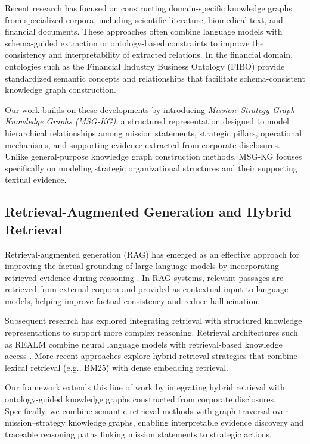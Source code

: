 \documentclass[11pt]{article}
\begin{document}
Recent research has focused on constructing domain-specific knowledge graphs from specialized corpora, including scientific literature, biomedical text, and financial documents. These approaches often combine language models with schema-guided extraction or ontology-based constraints to improve the consistency and interpretability of extracted relations. In the financial domain, ontologies such as the Financial Industry Business Ontology (FIBO) provide standardized semantic concepts and relationships that facilitate schema-consistent knowledge graph construction.

Our work builds on these developments by introducing \textit{Mission--Strategy Graph Knowledge Graphs (MSG-KG)}, a structured representation designed to model hierarchical relationships among mission statements, strategic pillars, operational mechanisms, and supporting evidence extracted from corporate disclosures. Unlike general-purpose knowledge graph construction methods, MSG-KG focuses specifically on modeling strategic organizational structures and their supporting textual evidence.

\subsection{Retrieval-Augmented Generation and Hybrid Retrieval}

Retrieval-augmented generation (RAG) has emerged as an effective approach for improving the factual grounding of large language models by incorporating retrieved evidence during reasoning \cite{lewis2020retrieval}. In RAG systems, relevant passages are retrieved from external corpora and provided as contextual input to language models, helping improve factual consistency and reduce hallucination.

Subsequent research has explored integrating retrieval with structured knowledge representations to support more complex reasoning. Retrieval architectures such as REALM combine neural language models with retrieval-based knowledge access \cite{guu2020realm}. More recent approaches explore hybrid retrieval strategies that combine lexical retrieval (e.g., BM25) with dense embedding retrieval.

Our framework extends this line of work by integrating hybrid retrieval with ontology-guided knowledge graphs constructed from corporate disclosures. Specifically, we combine semantic retrieval methods with graph traversal over mission–strategy knowledge graphs, enabling interpretable evidence discovery and traceable reasoning paths linking mission statements to strategic actions.
\end{document}
